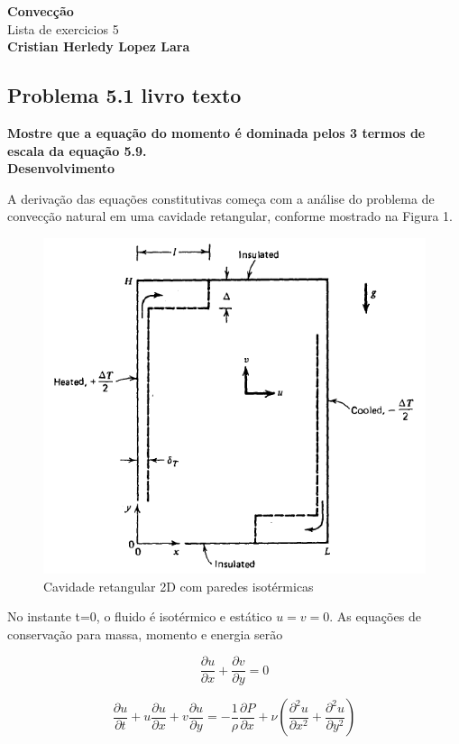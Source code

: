 \documentclass[12pt]{article}
\title{}
\author{}
\begin{document}
\begin{center}
	{\tiny {\normalsize {\large \textbf{Convecção}\\ Lista de exercicios 5\\
	
	\textbf{Cristian Herledy Lopez Lara}}}}
\end{center}

\subsection*{Problema 5.1 livro texto}


\textbf{Mostre que a equação do momento é dominada pelos 3 termos de escala da equação 5.9.}\\

\textbf{Desenvolvimento} 

A derivação das equações constitutivas começa com a análise do problema de convecção natural em uma cavidade retangular, conforme mostrado na Figura 1.

\begin{figure}[H]
	\centering
	\includegraphics[width=.65\textwidth]{Figures/1_1}
	\caption{Cavidade retangular 2D com paredes isotérmicas}
\end{figure}

No instante t=0, o fluido é isotérmico e estático $u = v = 0$. As equações de conservação para massa, momento e energia serão

\begin{equation}
	\frac{\partial u}{\partial x} + \frac{\partial v}{\partial y} = 0
\end{equation}

\begin{equation}
	\frac{\partial u}{\partial t} + u \frac{\partial u}{\partial x} + v \frac{\partial u}{\partial y} = -\frac{1}{\rho} \frac{\partial P}{\partial x} + \nu \left( \frac{\partial^2 u}{\partial x^2} + \frac{\partial^2 u}{\partial y^2} \right)
\end{equation}
\end{document}
